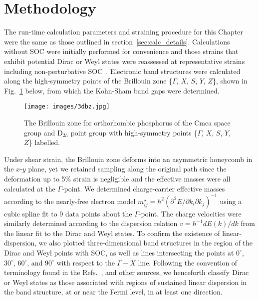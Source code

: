 \section{Methodology}
\label{sec:methodology2}

The run-time calculation parameters 
and straining procedure for this Chapter  
were the same as those outlined 
in section~\ref{sec:calc_details}.
%
Calculations without SOC 
were initially performed for convenience 
and those strains that exhibit potential Dirac or Weyl states 
were reassessed at representative strains 
including non-perturbative SOC~\cite{PhysRevB.71.115106}.
%
Electronic band structures 
were calculated along the high-symmetry points 
of the Brillouin zone 
{\{$\Gamma$, $X$, $S$, $Y$, $Z$\}}, 
shown in Fig.~\ref{fig:bz} below, 
from which the Kohn-Sham band gaps 
were determined.

\begin{figure}[th!]
\centering
\texttt{[image: images/3dbz.jpg]}
\caption[Brillouin zone of orthorhombic phosphorus]
{The Brillouin zone for orthorhombic phosphorus 
of the Cmca space group and D$_{2h}$ point group 
with high-symmetry points 
\{$\Gamma$, $X$, $S$, $Y$, $Z$\} labelled.}
\label{fig:bz}
\end{figure}
%
Under shear strain, the Brillouin zone 
deforms into an asymmetric honeycomb 
in the $x$-$y$ plane, 
yet we retained sampling along the original  
path since the deformation 
up to 5\% strain is negligible 
and the effective masses were all
calculated at the $\Gamma$-point.
%
We determined 
charge-carrier effective masses 
according to the nearly-free electron model 
$m_{ij}^\star=\hbar^2\left(\partial^2E/\partial k_i\partial k_j \right)^{-1}$ 
using a cubic spline fit to 
9 data points about the $\Gamma$-point.
%
The charge velocities were similarly 
determined according to the dispersion relation 
$v=\hbar^{-1}dE(k)/dk$ 
from the linear fit to 
the Dirac and Weyl states.
%
To confirm the existence of linear-dispersion, 
we also plotted three-dimensional band structures 
in the region of the Dirac and Weyl points with SOC, 
as well as lines intersecting the points 
at $0^\circ$, $30^\circ$, $60^\circ$, and $90^\circ$ 
with respect to the $\Gamma-X$ line.
%
Following the convention of terminology 
found in the Refs.~\cite{doi:10.1021/acs.nanolett.5b04106,Kim723,Shekhar2015}, and other sources, 
we henceforth classify Dirac or Weyl states 
as those associated with regions 
of sustained linear dispersion 
in the band structure, 
at or near the Fermi level, 
in at least one direction.


